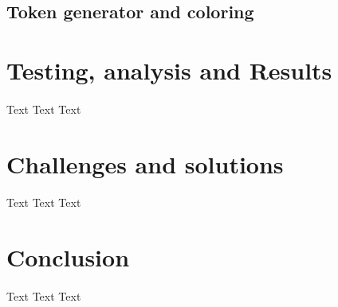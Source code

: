 \documentclass[a4paper]{article}
\begin{document}
\subsection{Token generator and coloring}

%                                      
\section{Testing, analysis and Results}   

\paragraph{}
Text Text Text

%
\section{Challenges and solutions}    

\paragraph{}
Text Text Text

%
\section{Conclusion}

\paragraph{}
Text Text Text

%

%

%
%
\end{document}
